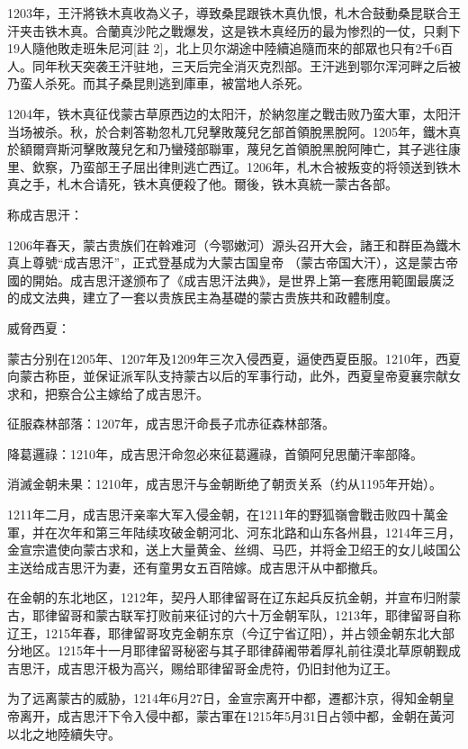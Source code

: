 1203年，王汗將铁木真收為义子，導致桑昆跟铁木真仇恨，札木合鼓動桑昆联合王汗夹击铁木真。合蘭真沙陀之戰爆发，这是铁木真经历的最为惨烈的一仗，只剩下19人隨他敗走班朱尼河[註 2]，北上贝尔湖途中陸續追隨而來的部眾也只有2千6百人。同年秋天突袭王汗驻地，三天后完全消灭克烈部。王汗逃到鄂尔浑河畔之后被乃蛮人杀死。而其子桑昆則逃到庫車，被當地人杀死。

1204年，铁木真征伐蒙古草原西边的太阳汗，於納忽崖之戰击败乃蛮大軍，太阳汗当场被杀。秋，於合剌答勒忽札兀兒擊敗蔑兒乞部首領脫黑脫阿。1205年，鐵木真於額爾齊斯河擊敗蔑兒乞和乃蠻殘部聯軍，蔑兒乞首領脫黑脫阿陣亡，其子逃往康里、欽察，乃蛮部王子屈出律則逃亡西辽。1206年，札木合被叛变的将领送到铁木真之手，札木合请死，铁木真便殺了他。爾後，铁木真統一蒙古各部。

称成吉思汗：

1206年春天，蒙古贵族们在斡难河（今鄂嫩河）源头召开大会，諸王和群臣為鐵木真上尊號“成吉思汗”，正式登基成为大蒙古国皇帝 （蒙古帝国大汗），这是蒙古帝國的開始。成吉思汗遂颁布了《成吉思汗法典》，是世界上第一套應用範圍最廣泛的成文法典，建立了一套以贵族民主為基礎的蒙古贵族共和政體制度。

威脅西夏：

蒙古分别在1205年、1207年及1209年三次入侵西夏，逼使西夏臣服。1210年，西夏向蒙古称臣，並保证派军队支持蒙古以后的军事行动，此外，西夏皇帝夏襄宗献女求和，把察合公主嫁给了成吉思汗。

征服森林部落：1207年，成吉思汗命長子朮赤征森林部落。

降葛邏祿：1210年，成吉思汗命忽必來征葛邏祿，首領阿兒思蘭汗率部降。

消滅金朝未果：1210年，成吉思汗与金朝断绝了朝贡关系（约从1195年开始）。

1211年二月，成吉思汗亲率大军入侵金朝，在1211年的野狐嶺會戰击败四十萬金軍，并在次年和第三年陆续攻破金朝河北、河东北路和山东各州县，1214年三月，金宣宗遣使向蒙古求和，送上大量黄金、丝绸、马匹，并将金卫绍王的女儿岐国公主送给成吉思汗为妻，还有童男女五百陪嫁。成吉思汗从中都撤兵。

在金朝的东北地区，1212年，契丹人耶律留哥在辽东起兵反抗金朝，并宣布归附蒙古，耶律留哥和蒙古联军打败前来征讨的六十万金朝军队，1213年，耶律留哥自称辽王，1215年春，耶律留哥攻克金朝东京（今辽宁省辽阳），并占领金朝东北大部分地区。1215年十一月耶律留哥秘密与其子耶律薛阇带着厚礼前往漠北草原朝觐成吉思汗，成吉思汗极为高兴，赐给耶律留哥金虎符，仍旧封他为辽王。

为了远离蒙古的威胁，1214年6月27日，金宣宗离开中都，遷都汴京，得知金朝皇帝离开，成吉思汗下令入侵中都，蒙古軍在1215年5月31日占领中都，金朝在黃河以北之地陸續失守。

